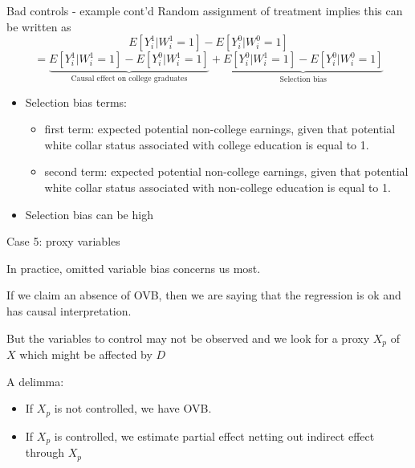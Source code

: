 \documentclass[handout]{beamer}
\begin{document}
\begin{frame}{Bad controls - example cont'd}
Random assignment of treatment implies this can be written as 
\[E[Y^1_{i}|W^1_{i}=1]-E[Y^0_{i}|W^0_{i}=1] \]
\[=\underbrace{E[Y^1_{i}|W^1_i=1]-E[Y^0_{i}|W^1_{i}=1]}_{\text{Causal effect on college graduates}}+\underbrace{E[Y^0_{i}|W^1_{i}=1]-E[Y^0_{i}|W^0_{i}=1]}_{\text{Selection bias}} \]\begin{itemize}
\item Selection bias terms: 
\begin{itemize}
\item first term: expected potential non-college earnings, given that potential white collar status associated with college education is equal to 1.
\item second term: expected potential non-college earnings, given that potential white collar status associated with non-college education is equal to 1.
\end{itemize} \item Selection bias can be high %


\end{itemize}
\end{frame}


\begin{frame}{Case 5: proxy variables}
\begin{center}
\end{center}
In practice, omitted variable bias concerns us most.\medskip

If we claim an absence of OVB, then we are saying that the regression is ok and has causal interpretation.\medskip

But the variables to control may not be observed and we look for a proxy $X_p$ of $X$ which might be affected by $D$\medskip

A delimma:
\begin{itemize}
\item If $X_p$ is not controlled, we have OVB.
\item If $X_p$ is controlled, we estimate partial effect netting out indirect effect through $X_p$
\end{itemize}
\end{frame}
\end{document}
